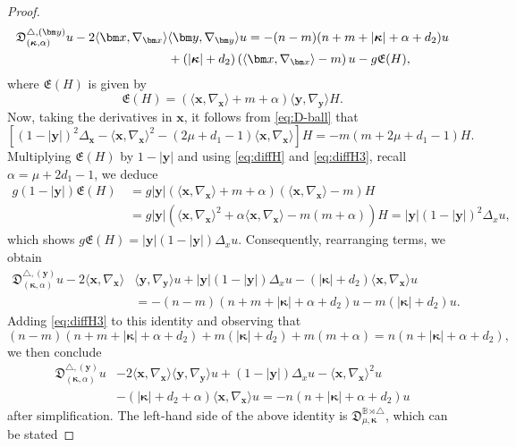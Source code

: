 \documentclass{amsart}
\theoremstyle{remark}
\def\la{{\langle}}
\def\ra{{\rangle}}
\def\fD{{\mathfrak D}}
\def\fE{{\mathfrak E}}
\def\a{{\alpha}}
\def\la{{\langle}}
\def\ra{{\rangle}}
\def\yb{{\bm y}}
\def\BB{{\mathbb B}}
\def\bk{{\boldsymbol{\kappa}}}
\begin{document}
\begin{proof}
\begin{align} \label{eq:diff-gH}
\fD_{(\bk,\a)}^{\triangle, (\yb)} u  -  2 \la \bm x, \nabla_{\bm x} \ra  & \la \bm y, \nabla_{\bm y} \ra u 
 =  - (n-m) (n+ m + |\bk|+ \a +d_2) u \\
  & + (|\bk|+ d_2)\left (\la \bm x, \nabla_{\bm x} \ra -m\right )u  - g  \fE(H), \notag
\end{align}
where $\fE(H)$ is given by 
$$
  \fE(H) =  (\la \bm x, \nabla_{\bm x} \ra +m + \a) \la \bm y, \nabla_{\bm y} \ra H.
$$
Now, taking the derivatives in $\bm x$, it follows from \eqref{eq:D-ball} that 
\begin{equation} \label{eq:diffH3}
  \left[ (1-|\bm y|)^2 \Delta_{\bm x} - \la \bm x, \nabla_{\bm x} \ra^2 - (2\mu + d_1 -1) \la \bm x, \nabla_{\bm x} \ra \right ]  H = 
    -m(m+2\mu+d_1-1) H. 
\end{equation}
Multiplying $\fE(H)$ by $1-|\bm y|$ and using \eqref{eq:diffH} and \eqref{eq:diffH3}, recall $\a = \mu + 2 d_1 -1$, we deduce
\begin{align*}
 g (1-|\bm y|) \fE(H)%
 \, & = g |\bm y| ( \la \bm x, \nabla_{\bm x} \ra +m + \a) (\la \bm x, \nabla_{\bm x} \ra -m) H \\
 & = g |\bm y| (\la \bm x, \nabla_{\bm x} \ra^2 + \a \la \bm x, \nabla_{\bm x} \ra - m(m+\a) )H 
 =  |\bm y| (1-|\bm y|)^2 \Delta_x u,
\end{align*}
which shows $g \fE(H) =  |\bm y| (1-|\bm y|) \Delta_x u$. Consequently, rearranging terms, we obtain
\begin{align*}
 \fD_{(\bk,\a)}^{\triangle, (\yb)} u  - 2 \la \bm x, \nabla_{\bm x} \ra &  \la \bm y, \nabla_{\bm y} \ra u 
+  |\bm y| (1-|\bm y|) \Delta_x u - (|\bk|+ d_2) \la \bm x, \nabla_{\bm x} \ra u  \\
& =  - (n-m) (n+ m + |\bk|+ \a +d_2) u  - m(|\bk|+ d_2) u.
\end{align*}
Adding \eqref{eq:diffH3} to this identity and observing that
$$
 (n-m) (n+ m + |\bk|+ \a +d_2)  + m(|\bk|+ d_2) + m(m + \a) =  n(n+|\bk| + \a + d_2),
$$
we then conclude 
\begin{align*}
    \fD_{(\bk, \a)}^{\triangle, (\yb)} u  & - 2 \la \bm x, \nabla_{\bm x} \ra  \la \bm y, \nabla_{\bm y} \ra u 
+ (1-|\bm y|) \Delta_x u - \la \bm x, \nabla_{\bm x} \ra^2 u\\
& - (|\bk|+ d_2+\a) \la \bm x, \nabla_{\bm x} \ra u   = - n(n+|\bk| + \a + d_2)u
\end{align*}
after simplification. The left-hand side of the above identity is  $\fD_{\mu,\bk}^{\BB\rtimes \triangle}$, which can be stated 

\end{proof}
\end{document}

